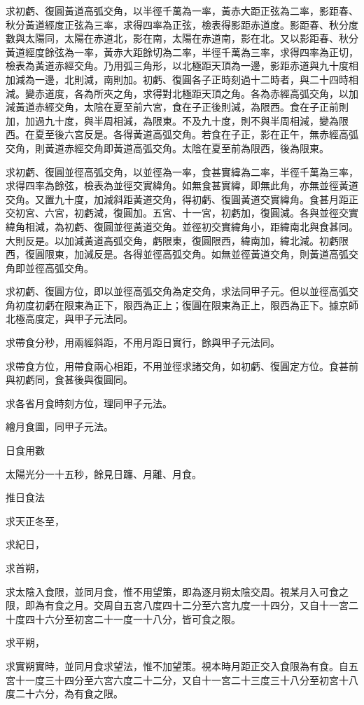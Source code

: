 \begin{pinyinscope}
求初虧、復圓黃道高弧交角，以半徑千萬為一率，黃赤大距正弦為二率，影距春、秋分黃道經度正弦為三率，求得四率為正弦，檢表得影距赤道度。影距春、秋分度數與太陽同，太陽在赤道北，影在南，太陽在赤道南，影在北。又以影距春、秋分黃道經度餘弦為一率，黃赤大距餘切為二率，半徑千萬為三率，求得四率為正切，檢表為黃道赤經交角。乃用弧三角形，以北極距天頂為一邊，影距赤道與九十度相加減為一邊，北則減，南則加。初虧、復圓各子正時刻過十二時者，與二十四時相減。變赤道度，各為所夾之角，求得對北極距天頂之角。各為赤經高弧交角，以加減黃道赤經交角，太陰在夏至前六宮，食在子正後則減，為限西。食在子正前則加，加過九十度，與半周相減，為限東。不及九十度，則不與半周相減，變為限西。在夏至後六宮反是。各得黃道高弧交角。若食在子正，影在正午，無赤經高弧交角，則黃道赤經交角即黃道高弧交角。太陰在夏至前為限西，後為限東。

求初虧、復圓並徑高弧交角，以並徑為一率，食甚實緯為二率，半徑千萬為三率，求得四率為餘弦，檢表為並徑交實緯角。如無食甚實緯，即無此角，亦無並徑黃道交角。又置九十度，加減斜距黃道交角，得初虧、復圓黃道交實緯角。食甚月距正交初宮、六宮，初虧減，復圓加。五宮、十一宮，初虧加，復圓減。各與並徑交實緯角相減，為初虧、復圓並徑黃道交角。並徑初交實緯角小，距緯南北與食甚同。大則反是。以加減黃道高弧交角，虧限東，復圓限西，緯南加，緯北減。初虧限西，復圓限東，加減反是。各得並徑高弧交角。如無並徑黃道交角，則黃道高弧交角即並徑高弧交角。

求初虧、復圓方位，即以並徑高弧交角為定交角，求法同甲子元。但以並徑高弧交角初度初虧在限東為正下，限西為正上；復圓在限東為正上，限西為正下。據京師北極高度定，與甲子元法同。

求帶食分秒，用兩經斜距，不用月距日實行，餘與甲子元法同。

求帶食方位，用帶食兩心相距，不用並徑求諸交角，如初虧、復圓定方位。食甚前與初虧同，食甚後與復圓同。

求各省月食時刻方位，理同甲子元法。

繪月食圖，同甲子元法。

日食用數

太陽光分一十五秒，餘見日躔、月離、月食。

推日食法

求天正冬至，

求紀日，

求首朔，

求太陰入食限，並同月食，惟不用望策，即為逐月朔太陰交周。視某月入可食之限，即為有食之月。交周自五宮八度四十二分至六宮九度一十四分，又自十一宮二十度四十六分至初宮二十一度一十八分，皆可食之限。

求平朔，

求實朔實時，並同月食求望法，惟不加望策。視本時月距正交入食限為有食。自五宮十一度三十四分至六宮六度二十二分，又自十一宮二十三度三十八分至初宮十八度二十六分，為有食之限。


\end{pinyinscope}
